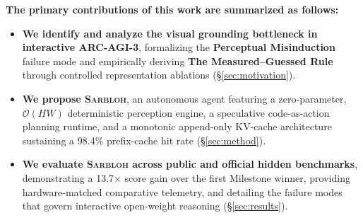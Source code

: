 \textbf{The primary contributions of this work are summarized as follows:}
\begin{itemize}
    \item \textbf{We identify and analyze the visual grounding bottleneck in interactive ARC-AGI-3}, formalizing the \textbf{Perceptual Misinduction} failure mode and empirically deriving \textbf{The Measured--Guessed Rule} through controlled representation ablations (§\ref{sec:motivation}).
    \item \textbf{We propose \textsc{Sarbloh}}, an autonomous agent featuring a zero-parameter, $\mathcal{O}(HW)$ deterministic perception engine, a speculative code-as-action planning runtime, and a monotonic append-only KV-cache architecture sustaining a 98.4\% prefix-cache hit rate (§\ref{sec:method}).
    \item \textbf{We evaluate \textsc{Sarbloh} across public and official hidden benchmarks}, demonstrating a 13.7$\times$ score gain over the first Milestone winner, providing hardware-matched comparative telemetry, and detailing the failure modes that govern interactive open-weight reasoning (§\ref{sec:results}).
\end{itemize}
